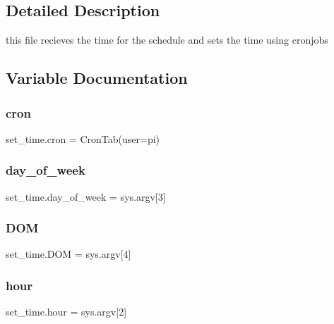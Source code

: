 \subsection{Detailed Description}
this file recieves the time for the schedule and sets the time using cronjobs 

\subsection{Variable Documentation}
\mbox{\label{namespaceset__time_a5ff4dfadfd2f8d3122de7fbb7315f4cf}} 
\subsubsection{\texorpdfstring{cron}{cron}}
{\footnotesize\ttfamily set\+\_\+time.\+cron = Cron\+Tab(user=\textquotesingle{}pi\textquotesingle{})}

\mbox{\label{namespaceset__time_a0d28e53eeaf0bdbab2f1719272f31912}} 
\subsubsection{\texorpdfstring{day\+\_\+of\+\_\+week}{day\_of\_week}}
{\footnotesize\ttfamily set\+\_\+time.\+day\+\_\+of\+\_\+week = sys.\+argv\mbox{[}3\mbox{]}}

\mbox{\label{namespaceset__time_aa07c97b77846215f6e507c5c01c9c340}} 
\subsubsection{\texorpdfstring{D\+OM}{DOM}}
{\footnotesize\ttfamily set\+\_\+time.\+D\+OM = sys.\+argv\mbox{[}4\mbox{]}}

\mbox{\label{namespaceset__time_a9b9cd4838ca6ba8e8653b93ec5bf1ccd}} 
\subsubsection{\texorpdfstring{hour}{hour}}
{\footnotesize\ttfamily set\+\_\+time.\+hour = sys.\+argv\mbox{[}2\mbox{]}}


